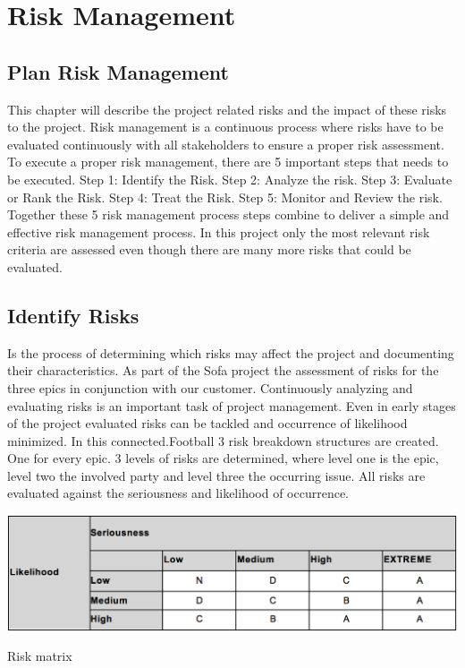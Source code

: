 \section{Risk Management}
\label{sec:risk}

\subsection{Plan Risk Management}
This chapter will describe the project related risks and the impact of these risks to the project. Risk management is a continuous process where risks have to be evaluated continuously with all stakeholders to ensure a proper risk assessment. To execute a proper risk management, there are 5 important steps that needs to be executed.
\newline
\newline
Step 1: Identify the Risk.\newline
Step 2: Analyze the risk.\newline
Step 3: Evaluate or Rank the Risk.\newline
Step 4: Treat the Risk.\newline
Step 5: Monitor and Review the risk.\newline
\newline
Together these 5 risk management process steps combine to deliver a simple and effective risk management process.
In this project only the most relevant risk criteria are assessed even though there are many more risks that could be evaluated.

\subsection{Identify Risks}
Is the process of determining which risks may affect the project and documenting their characteristics.
As part of the Sofa project the assessment of risks for the three epics in conjunction with our customer.
Continuously analyzing and evaluating risks is an important task of project management. Even in early stages of the project evaluated risks can be tackled and occurrence of likelihood minimized.
In this connected.Football 3 risk breakdown structures are created.
One for every epic. 3 levels of risks are determined, where level one is the epic, level two the involved party and level three the occurring issue. All risks are evaluated against the seriousness and likelihood of occurrence.

\begin{table}[!ht]
  \includegraphics[width=\linewidth]{content/diagram/risk/risk_grading.png}
  \caption{Risk matrix}
\end{table}
\newpage

